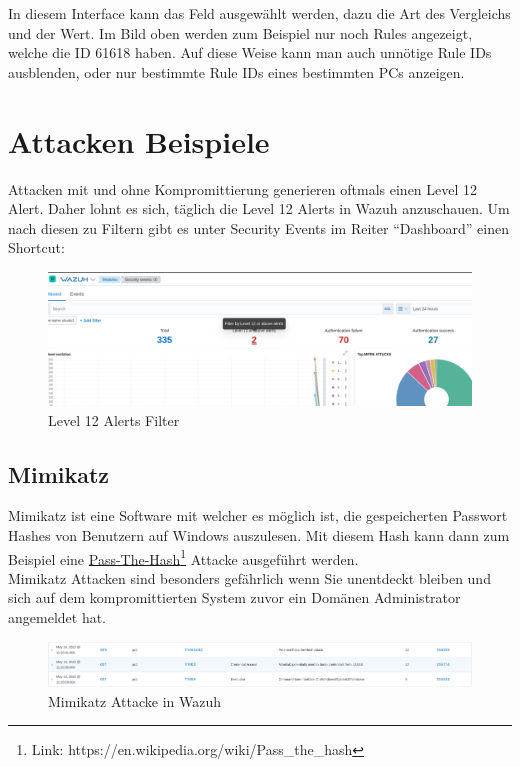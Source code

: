 In diesem Interface kann das Feld ausgewählt werden, dazu die Art des Vergleichs und der Wert.
Im Bild oben werden zum Beispiel nur noch Rules angezeigt, welche die ID 61618 haben.
Auf diese Weise kann man auch unnötige Rule IDs ausblenden, oder nur bestimmte Rule IDs eines bestimmten PCs anzeigen.

\section{Attacken Beispiele}
Attacken mit und ohne Kompromittierung generieren oftmals einen Level 12 Alert. Daher lohnt es sich, täglich die Level 12 Alerts in Wazuh anzuschauen.
Um nach diesen zu Filtern gibt es unter Security Events im Reiter ``Dashboard'' einen Shortcut:
\begin{figure}[H]
    \centering
    \includegraphics[width=\linewidth]{../img/filter-by-level12.png}
    \caption{Level 12 Alerts Filter}
\end{figure}


\subsection{Mimikatz}
Mimikatz ist eine Software mit welcher es möglich ist, die gespeicherten Passwort Hashes von Benutzern auf Windows auszulesen.
Mit diesem Hash kann dann zum Beispiel eine \href{https://en.wikipedia.org/wiki/Pass\_the\_hash}{Pass-The-Hash}\footnote{Link: https://en.wikipedia.org/wiki/Pass\_the\_hash} Attacke ausgeführt werden.\\

Mimikatz Attacken sind besonders gefährlich wenn Sie unentdeckt bleiben und sich auf dem kompromittierten System zuvor ein Domänen Administrator angemeldet hat.
\begin{figure}[H]
    \centering
    \includegraphics[width=\linewidth]{../img/mimikatz.png}
    \caption{Mimikatz Attacke in Wazuh}
\end{figure}

